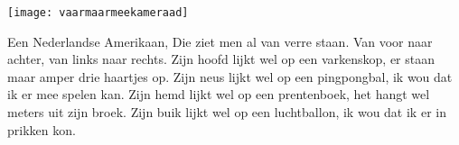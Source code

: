 \begin{intersong}
    \texttt{[image: vaarmaarmeekameraad]}
\end{intersong}
\beginverse*
Een Nederlandse Amerikaan,
Die ziet men al van verre staan. 
\endverse
\beginchorus
Van voor naar achter, van links naar rechts. 
\endchorus
\beginverse*
Zijn hoofd lijkt wel op een varkenskop,
er staan maar amper drie haartjes op. 
\endverse
\beginverse*
Zijn neus lijkt wel op een pingpongbal,
ik wou dat ik er mee spelen kan. 
\endverse
\beginverse*
Zijn hemd lijkt wel op een prentenboek,
het hangt wel meters uit zijn broek. 
\endverse
\beginverse*
Zijn buik lijkt wel op een luchtballon,
ik wou dat ik er in prikken kon. 
\endverse
\endsong